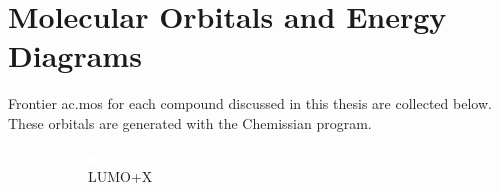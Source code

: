 \chapter{Molecular Orbitals and Energy Diagrams} \label{app.mos}

Frontier \glspl{ac.mo} for each compound discussed in this thesis are collected below. These orbitals are generated with the Chemissian program\autocite{chemissian}.

\begin{figure}[!ht]
 \centering
 \begin{subfigure}[b]{0.33\textwidth}
  \includegraphics[clip=true, width=\textwidth, keepaspectratio]{images/insertgraphic.eps}
  \caption{LUMO+X}
 \end{subfigure}
 \begin{subfigure}[b]{0.33\textwidth}

\end{subfigure}
\end{figure}

